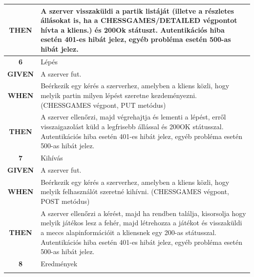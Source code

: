 \documentclass[twoside, a4paper, 12pt]{article}
\begin{document}
\begin{longtable}[c]{|c|p{14cm}|}
	\textbf{THEN} &
	A szerver visszaküldi a partik listáját (illetve a részletes állásokat is, ha a CHESSGAMES/DETAILED végpontot hívta a kliens.) és 200Ok státuszt.
	Autentikációs hiba esetén 401-es hibát jelez, egyéb probléma esetén 500-as hibát jelez.
	\\
	\hline
	
	\rowcolor[HTML]{CBCEFB} 
	\textbf{6}
	&	Lépés
	\\ \nobreakhline
	
	\textbf{GIVEN} &
	A szerver fut.
	\\ \nobreakhline
	
	\textbf{WHEN} &
	Beérkezik egy kérés a szerverhez, amelyben a kliens közli, hogy melyik partin milyen lépést szeretne kezdeményezni. (CHESSGAMES végpont, PUT metódus)
	\\
	\nobreakhline
	
	\textbf{THEN} &
	A szerver ellenőrzi, majd végrehajtja és lementi a lépést, erről visszaigazolást küld a legfrisebb állással és 200OK státusszal.
	Autentikációs hiba esetén 401-es hibát jelez, egyéb probléma esetén 500-as hibát jelez.
	\\
	\hline
	
	\rowcolor[HTML]{CBCEFB} 
	\textbf{7}
	&	Kihívás
	\\ \nobreakhline
	
	\textbf{GIVEN} &
	A szerver fut.
	\\ \nobreakhline
	
	\textbf{WHEN} &
	Beérkezik egy kérés a szerverhez, amelyben a kliens közli, hogy melyik felhasználót szeretné kihívni. (CHESSGAMES végpont, POST metódus)
	\\
	\nobreakhline
	
	\textbf{THEN} &
	A szerver ellenőrzi a kérést, majd ha rendben találja, kisorsolja hogy melyik játékos lesz a fehér, majd létrehozza a játékot és visszaküldi a meccs alapinformációit a kliensnek egy 200-as státusszal.
	Autentikációs hiba esetén 401-es hibát jelez, egyéb probléma esetén 500-as hibát jelez.
	\\
	\hline
	
	\rowcolor[HTML]{CBCEFB} 
	\textbf{8}
	&	Eredmények
	\\ \nobreakhline
	

\end{longtable}
\end{document}
